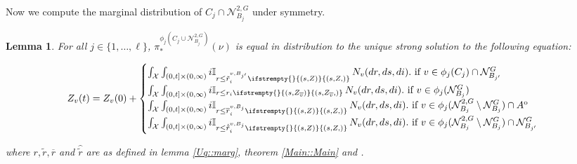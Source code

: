 \documentclass[12pt]{article}
\newcommand{\mb}{\mathbb}
\newcommand{\mc}{\mathcal}
\newcommand{\ov}{\overline}
\newcommand{\te}{\text}
\newcommand{\ind}{\hspace{24pt}}
\newcommand{\sta}{\mc{X}}							%
\newcommand{\gneigh}[2]{\mc{N}^{#1}_{#2}}			%
\newcommand{\dgneigh}[2]{\mc{N}^{2,#1}_{#2}}		%
\newcommand{\cl}[1]{\ov{#1}}						%
\newcommand{\indx}[1]{^{#1}}						%
\newcommand{\poiss}{N}								%
\newcommand{\rate}{r}								%
\newcommand{\proj}{\pi}								%
\newcommand{\poissv}[1]{_{#1}}						%
\newcommand{\vind}[1]{_{#1}}						%
\newcommand{\tme}[1]{(#1)}							%
\newcommand{\vpara}[1]{^{#1}}						%
\newcommand{\stpara}[1]{_{#1}}						%
\newcommand{\psf}{_*}								%
\newcommand{\psize}{\ell}							%
\newcommand{\tmepro}[3]{
\ifstrempty{#3}{
	\left(#1,#2\right)}{
	\left(#1,#2,#3\right)}}							%
\newcommand{\brate}{\alt{\rate}}					%
\newcommand{\inte}[1]{{#1}^\mathrm{o}}				%
\newcommand{\alt}[1]{\tilde{#1}}					%
\newcommand{\mm}{\nu}								%
\newcommand{\Xh}{Z}									%
\newcommand{\bgrate}{\ov{\rate}}					%
\newcommand{\bcrate}{\hat{\brate}}					%
\newcommand{\vjpara}[2]{^{#1,#2}}					%
\newtheorem{lem}[thms]{Lemma}
\begin{document}
Now we compute the marginal distribution of \(C_j\cap\dgneigh{G}{B_j}\) under symmetry. 
%
%

\begin{lem}
For all \(j \in \{1,\dots,\psize\}\), \(\proj\psf\vpara{\phi_j\left(C_j\cup\dgneigh{G}{B_j}\right)}(\mm)\) is equal in distribution to the unique strong solution to the following equation:

\begin{equation}
\Xh\vind{v}\tme{t} = \Xh\vind{v}\tme{0} + \begin{cases}
\int_\sta\int_{(0,t]\times(0,\infty)} i\mb{I}_{r \leq \brate\vjpara{v}{B_{j'}}\stpara{i}\tmepro{s}{\Xh}{}}\,\poiss\poissv{v}(dr,ds,di).\te{ if } v \in \phi_j(C_j)\cap \gneigh{G}{B_{j'}}\\
\int_\sta\int_{(0,t]\times(0,\infty)} i\mb{I}_{r \leq \rate\stpara{i}\tmepro{s}{\Xh\vind{\cl{v}}}{}}\,\poiss\poissv{v}(dr,ds,di).\te{ if } v \in \phi_j(\gneigh{G}{B_j})\\
\int_\sta\int_{(0,t]\times(0,\infty)} i\mb{I}_{r \leq \bgrate\vjpara{v}{B_j}\stpara{i}\tmepro{s}{\Xh}{}}\,\poiss\poissv{v}(dr,ds,di).\te{ if } v \in \phi_j(\dgneigh{G}{B_j}\setminus\gneigh{G}{B_j})\cap\inte{A}\\
\int_\sta\int_{(0,t]\times(0,\infty)} i\mb{I}_{r \leq \bcrate\vjpara{v}{B_j}\stpara{i}\tmepro{s}{\Xh}{}}\,\poiss\poissv{v}(dr,ds,di).\te{ if } v \in \phi_j(\dgneigh{G}{B_j}\setminus\gneigh{G}{B_j})\cap\gneigh{G}{B_{j'}}\\
\end{cases}
\label{Uq::marg2eqn}
\end{equation}

where \(\rate,\brate,\bgrate\) and \(\bcrate\) are as defined in lemma \ref{Uq::marg}, theorem \ref{Main::Main} and \cite[assumption \ref{F-a::bddr}]{F}.
\label{Uq::marg2}
\end{lem}
\end{document}
